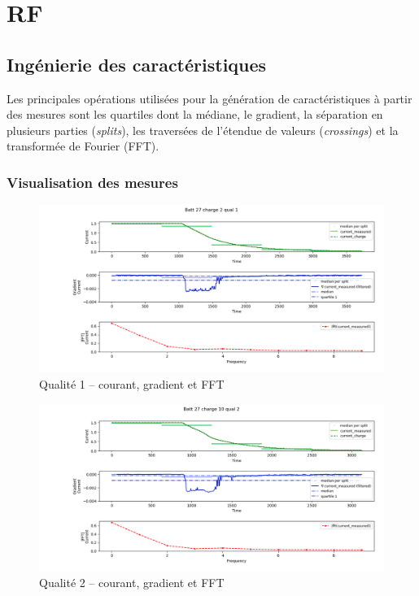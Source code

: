 \chapter{\ac{RF}}
\section{Ingénierie des caractéristiques}

Les principales opérations utilisées pour la génération de caractéristiques à partir des mesures sont les quartiles dont la médiane, le gradient, la séparation en plusieurs parties (\textit{splits}), les traversées de l'étendue de valeurs (\textit{crossings}) et la transformée de Fourier (FFT).

\subsection{Visualisation des mesures}

\begin{figure}['h!']
    \includegraphics[scale=0.47]{images/rf/batt27_charge2_qual1.png}
    \caption{Qualité 1 -- courant, gradient et FFT}
    \label{fig:RFquality1}
\end{figure}

\begin{figure}['h!']
    \includegraphics[scale=0.47]{images/rf/batt27_charge10_qual2.png}
    \caption{Qualité 2 -- courant, gradient et FFT}
    \label{fig:RFquality2}
\end{figure}

